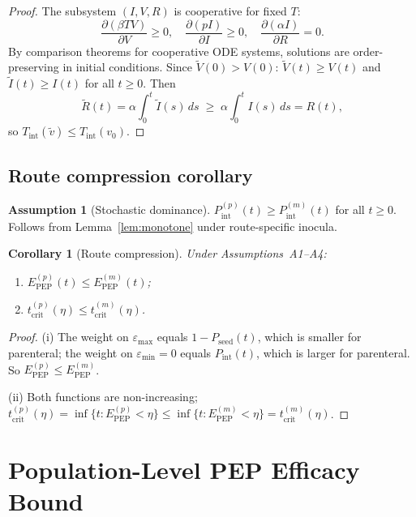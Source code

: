 \documentclass[11pt]{article}
\newtheorem{corollary}{Corollary}[section]
\theoremstyle{definition}
\newtheorem{assumption}{Assumption}[section]
\theoremstyle{remark}
\newcommand{\Tint}{T_{\text{int}}}
\newcommand{\Pseed}{P_{\text{seed}}}
\newcommand{\Pint}{P_{\text{int}}}
\newcommand{\Epep}{E_{\text{PEP}}}
\newcommand{\tcrit}{t_{\text{crit}}}
\newcommand{\emax}{\varepsilon_{\max}}
\newcommand{\emin}{\varepsilon_{\min}}
\begin{document}
\begin{proof}
The subsystem $(I, V, R)$ is cooperative for fixed $T$:
\[
\frac{\partial(\beta TV)}{\partial V} \geq 0, \quad
\frac{\partial(pI)}{\partial I} \geq 0, \quad
\frac{\partial(\alpha I)}{\partial R} = 0.
\]
By comparison theorems for cooperative ODE systems\cite{smith1995}, solutions are order-preserving in initial conditions. Since $\tilde{V}(0) > V(0)$: $\tilde{V}(t) \geq V(t)$ and $\tilde{I}(t) \geq I(t)$ for all $t \geq 0$. Then
\[
\tilde{R}(t) = \alpha \int_{0}^{t} \tilde{I}(s)\,ds \;\geq\; \alpha \int_{0}^{t} I(s)\,ds = R(t),
\]
so $\Tint(\tilde{v}) \leq \Tint(v_{0})$.
\end{proof}

\subsection{Route compression corollary}

\begin{assumption}[Stochastic dominance]
$\Pint^{(p)}(t) \geq \Pint^{(m)}(t)$ for all $t \geq 0$. Follows from Lemma~\ref{lem:monotone} under route-specific inocula.
\end{assumption}

\begin{corollary}[Route compression]\label{cor:route}
Under Assumptions~A1--A4:
\begin{enumerate}[label=\textnormal{(\roman*)},leftmargin=2.5em]
    \item $\Epep^{(p)}(t) \leq \Epep^{(m)}(t)$;
    \item $\tcrit^{(p)}(\eta) \leq \tcrit^{(m)}(\eta)$.
\end{enumerate}
\end{corollary}

\begin{proof}
(i) The weight on $\emax$ equals $1 - \Pseed(t)$, which is smaller for parenteral; the weight on $\emin = 0$ equals $\Pint(t)$, which is larger for parenteral. So $\Epep^{(p)} \leq \Epep^{(m)}$.

(ii) Both functions are non-increasing; $\tcrit^{(p)}(\eta) = \inf\{t : \Epep^{(p)} < \eta\} \leq \inf\{t : \Epep^{(m)} < \eta\} = \tcrit^{(m)}(\eta)$.
\end{proof}


\section{Population-Level PEP Efficacy Bound}
\end{document}
